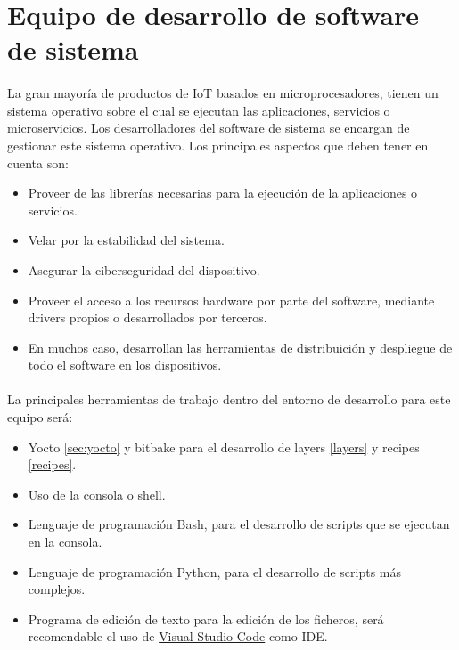 \section{Equipo de desarrollo de software de sistema}\label{sec:systemteam}

\paragraph{}La gran mayoría de productos de \gls{IoT} basados en microprocesadores,
tienen un sistema operativo sobre el cual se ejecutan las aplicaciones, servicios o
microservicios. Los desarrolladores del software de sistema se encargan de gestionar
este sistema operativo. Los principales aspectos que deben tener en cuenta son:

\begin{itemize}
    \item Proveer de las librerías necesarias para la ejecución de la aplicaciones o
    servicios.
    \item Velar por la estabilidad del sistema.
    \item Asegurar la ciberseguridad del dispositivo.
    \item Proveer el acceso a los recursos hardware por parte del software, mediante
    drivers propios o desarrollados por terceros.
    \item En muchos caso, desarrollan las herramientas de distribuición y despliegue
    de todo el software en los dispositivos.
\end{itemize}

\paragraph{}La principales herramientas de trabajo dentro del entorno de desarrollo para este equipo
será:

\begin{itemize}
    \item Yocto \ref{sec:yocto} y bitbake para el desarrollo de layers \ref{layers} y
    recipes \ref{recipes}.
    \item Uso de la consola o \gls{shell}.
    \item Lenguaje de programación Bash, para el desarrollo de \gls{scripts} que se
    ejecutan en la consola.
    \item Lenguaje de programación Python, para el desarrollo de \gls{scripts} más complejos.
    \item Programa de edición de texto para la edición de los ficheros, será recomendable
    el uso de \hyperref[sec:vscode]{Visual Studio Code} como \gls{IDE}.
\end{itemize}

